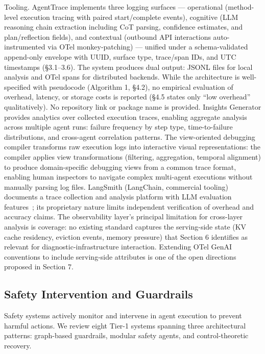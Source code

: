 \documentclass[preprint,12pt]{elsarticle}
\begin{document}
Tooling. AgentTrace \cite{v5ref2} implements three logging surfaces --- operational (method-level execution tracing with paired start/complete events), cognitive (LLM reasoning chain extraction including CoT parsing, confidence estimates, and plan/reflection fields), and contextual (outbound API interactions auto-instrumented via OTel monkey-patching) --- unified under a schema-validated append-only envelope with UUID, surface type, trace/span IDs, and UTC timestamps (\S{}3.1--3.6). The system produces dual output: JSONL files for local analysis and OTel spans for distributed backends. While the architecture is well-specified with pseudocode (Algorithm 1, \S{}4.2), no empirical evaluation of overhead, latency, or storage costs is reported (\S{}4.5 states only ``low overhead'' qualitatively). No repository link or package name is provided. Insights Generator \cite{v5ref23} provides analytics over collected execution traces, enabling aggregate analysis across multiple agent runs: failure frequency by step type, time-to-failure distributions, and cross-agent correlation patterns. The view-oriented debugging compiler \cite{v5ref46} transforms raw execution logs into interactive visual representations: the compiler applies view transformations (filtering, aggregation, temporal alignment) to produce domain-specific debugging views from a common trace format, enabling human inspectors to navigate complex multi-agent executions without manually parsing log files. LangSmith (LangChain, commercial tooling) documents a trace collection and analysis platform with LLM evaluation features~\cite{v5supp1}; its proprietary nature limits independent verification of overhead and accuracy claims. The observability layer's principal limitation for cross-layer analysis is coverage: no existing standard captures the serving-side state (KV cache residency, eviction events, memory pressure) that Section 6 identifies as relevant for diagnostic-infrastructure interaction. Extending OTel GenAI conventions to include serving-side attributes is one of the open directions proposed in Section 7.


\subsection{Safety Intervention and Guardrails}



Safety systems actively monitor and intervene in agent execution to prevent harmful actions. We review eight Tier-1 systems spanning three architectural patterns: graph-based guardrails, modular safety agents, and control-theoretic recovery.
\end{document}
